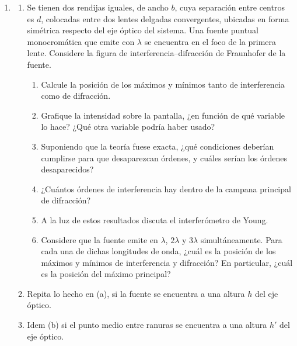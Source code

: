\documentclass[11pt,spanish]{article}
\begin{document}
\begin{enumerate}

    \item 

    \begin{enumerate}
        \item Se tienen dos rendijas iguales, de ancho $b$, cuya separación entre
        centros es $d$, colocadas entre dos lentes delgadas convergentes,
        ubicadas en forma simétrica respecto del eje óptico del sistema. Una
        fuente puntual monocromática que emite con $\lambda$ se encuentra
        en el foco de la primera lente. Considere la figura de interferencia--difracción
        de Fraunhofer de la fuente. 
        
        \begin{enumerate}
            \item Calcule la posición de los máximos y mínimos tanto de interferencia
            como de difracción. 

            \item Grafique la intensidad sobre la pantalla, ¿en función de qué variable
            lo hace? ¿Qué otra variable podría haber usado?

            \item Suponiendo que la teoría fuese exacta, ¿qué condiciones deberían cumplirse
            para que desaparezcan órdenes, y cuáles serían los órdenes desaparecidos? 

            \item ¿Cuántos órdenes de interferencia hay dentro de la campana principal
            de difracción?

            \item A la luz de estos resultados discuta el interferómetro de Young. 

            \item Considere que la fuente emite en $\lambda$, $2\lambda$ y $3\lambda$
            simultáneamente. Para cada una de dichas longitudes de onda, ¿cuál
            es la posición de los máximos y mínimos de interferencia y difracción?
            En particular, ¿cuál es la posición del máximo principal?
        \end{enumerate}

        \item Repita lo hecho en (a), si la fuente se encuentra a una altura $h$
        del eje óptico.

        \item Idem (b) si el punto medio entre ranuras se encuentra a una altura
        $h'$ del eje óptico. 
    \end{enumerate}


\end{enumerate}
\end{document}
